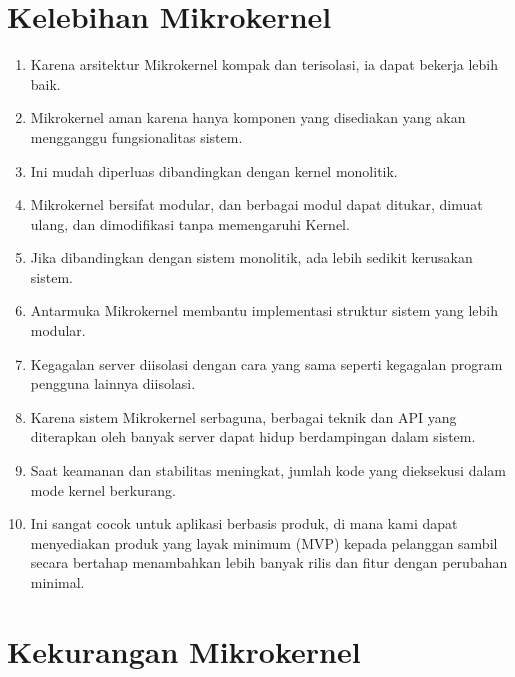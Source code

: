 \documentclass{report}
\begin{document}
	\vskip0.5cm
	
	\section*{Kelebihan Mikrokernel}
	
	\begin{enumerate}
		\item Karena arsitektur Mikrokernel kompak dan terisolasi, ia dapat bekerja lebih baik.
		
		\item Mikrokernel aman karena hanya komponen yang disediakan yang akan mengganggu fungsionalitas sistem. 
		
		\item Ini mudah diperluas dibandingkan dengan kernel monolitik. 
		
		\item Mikrokernel bersifat modular, dan berbagai modul dapat ditukar, dimuat ulang, dan dimodifikasi tanpa memengaruhi Kernel.
		
		\item Jika dibandingkan dengan sistem monolitik, ada lebih sedikit kerusakan sistem.
		
		\item Antarmuka Mikrokernel membantu implementasi struktur sistem yang lebih modular.
		
		\item Kegagalan server diisolasi dengan cara yang sama seperti kegagalan program pengguna lainnya diisolasi.
		
		\item Karena sistem Mikrokernel serbaguna, berbagai teknik dan API yang diterapkan oleh banyak server dapat hidup berdampingan dalam sistem.
		
		\item Saat keamanan dan stabilitas meningkat, jumlah kode yang dieksekusi dalam mode kernel berkurang.
		
		\item Ini sangat cocok untuk aplikasi berbasis produk, di mana kami dapat menyediakan produk yang layak minimum (MVP) kepada pelanggan sambil secara bertahap menambahkan lebih banyak rilis dan fitur dengan perubahan minimal.
	\end{enumerate}
	
	\section*{Kekurangan Mikrokernel}
	
\end{document}
